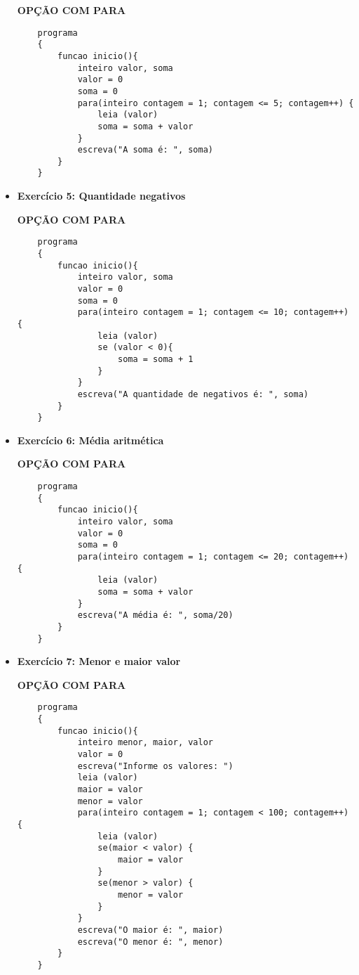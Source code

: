 \documentclass{article}
\begin{document}
\begin{itemize}
    \textbf{OPÇÃO COM PARA}
    \begin{lstlisting}
    programa
    {
        funcao inicio(){
            inteiro valor, soma
            valor = 0
            soma = 0
            para(inteiro contagem = 1; contagem <= 5; contagem++) {
                leia (valor)
                soma = soma + valor
            }
            escreva("A soma é: ", soma)
        }
    }
    \end{lstlisting}

    \item \textbf{Exercício 5: Quantidade negativos}
    
    \textbf{OPÇÃO COM PARA}
    \begin{lstlisting}
    programa
    {
        funcao inicio(){
            inteiro valor, soma
            valor = 0
            soma = 0
            para(inteiro contagem = 1; contagem <= 10; contagem++) {
                leia (valor)
                se (valor < 0){
                    soma = soma + 1
                }
            }
            escreva("A quantidade de negativos é: ", soma)
        }
    }
    \end{lstlisting}

    \item \textbf{Exercício 6: Média aritmética}
    
    \textbf{OPÇÃO COM PARA}
    \begin{lstlisting}
    programa
    {
        funcao inicio(){
            inteiro valor, soma
            valor = 0
            soma = 0
            para(inteiro contagem = 1; contagem <= 20; contagem++) {
                leia (valor)
                soma = soma + valor
            }
            escreva("A média é: ", soma/20)
        }
    }
    \end{lstlisting}

    \item \textbf{Exercício 7: Menor e maior valor}
    
    \textbf{OPÇÃO COM PARA}
    \begin{lstlisting}
    programa
    {
        funcao inicio(){
            inteiro menor, maior, valor
            valor = 0
            escreva("Informe os valores: ")
            leia (valor)
            maior = valor
            menor = valor
            para(inteiro contagem = 1; contagem < 100; contagem++) {
                leia (valor)
                se(maior < valor) {
                    maior = valor
                }
                se(menor > valor) {
                    menor = valor
                }
            }
            escreva("O maior é: ", maior)
            escreva("O menor é: ", menor)
        }
    }
    \end{lstlisting}
\end{itemize}
\end{document}
